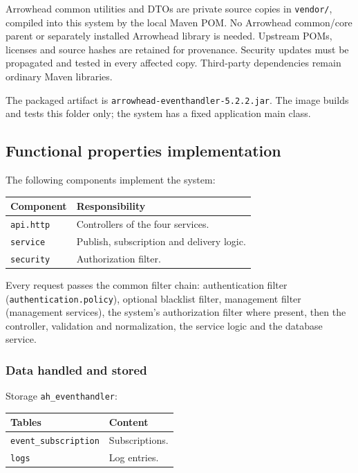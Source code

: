\documentclass[a4paper]{arrowhead}
\begin{document}
Arrowhead common utilities and DTOs are private source copies in \texttt{vendor/}, compiled into this system by the local Maven POM. No Arrowhead common/core parent or separately installed Arrowhead library is needed. Upstream POMs, licenses and source hashes are retained for provenance. Security updates must be propagated and tested in every affected copy. Third-party dependencies remain ordinary Maven libraries.

The packaged artifact is \texttt{arrowhead-\allowbreak{}eventhandler-5.2.2.jar}. The image builds and tests this folder only; the system has a fixed application main class.

\subsection{Functional properties implementation}

The following components implement the system:

\noindent\begin{longtable}{| p{5.6cm} | p{9.6cm} |} \hline
\rowcolor{gray!33} Component & Responsibility \\ \hline \endhead
\texttt{api.\allowbreak{}http} & Controllers of the four services. \\ \hline
\texttt{service} & Publish, subscription and delivery logic. \\ \hline
\texttt{security} & Authorization filter. \\ \hline
\end{longtable}

Every request passes the common filter chain: authentication filter (\texttt{authentication.\allowbreak{}policy}), optional blacklist filter, management filter (management services), the system's authorization filter where present, then the controller, validation and normalization, the service logic and the database service.

\subsubsection{Data handled and stored}

Storage \texttt{ah\_\allowbreak{}eventhandler}:

\noindent\begin{longtable}{| p{6.4cm} | p{8.8cm} |} \hline
\rowcolor{gray!33} Tables & Content \\ \hline \endhead
\texttt{event\_\allowbreak{}subscription} & Subscriptions. \\ \hline
\texttt{logs} & Log entries. \\ \hline
\end{longtable}
\end{document}
